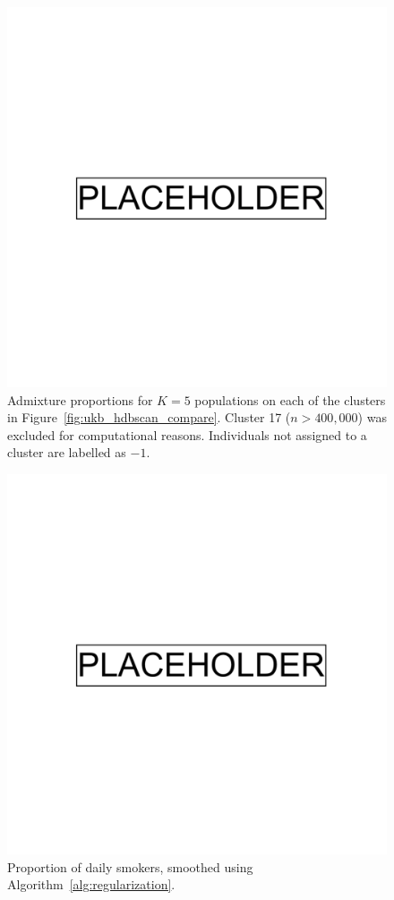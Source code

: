\begin{figure}[ht]
  \centering
    \includegraphics[width=0.8\linewidth]{placeholder.png}
    \caption[Admixture proportions for 5 populations]{Admixture proportions for $K=5$ populations on each of the clusters in Figure~\ref{fig:ukb_hdbscan_compare}. Cluster 17 ($n>400,000$) was excluded for computational reasons. Individuals not assigned to a cluster are labelled as $-1$.}
  \label{fig:supp_ukb_admix}
\end{figure}

\clearpage

\begin{figure}[ht]
  \centering
    \includegraphics[width=0.9\linewidth]{placeholder.png}
    \caption[Proportion of daily smokers]{Proportion of daily smokers, smoothed using Algorithm~\ref{alg:regularization}.}
    \label{fig:supp_ukb_smoking}
\end{figure}

